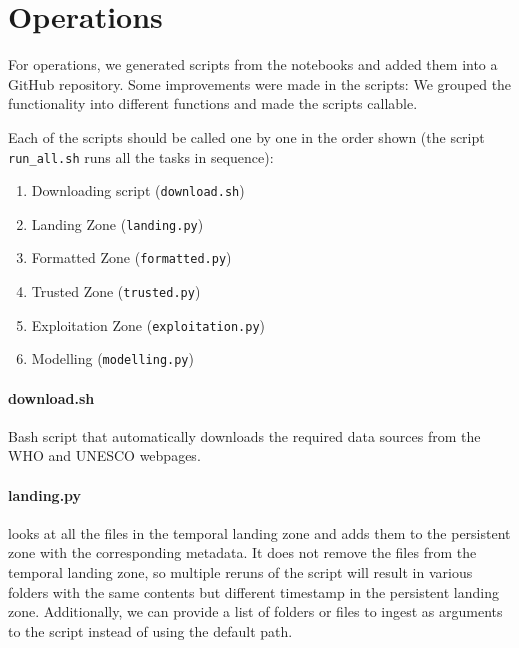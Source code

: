


\section{Operations}

For operations, we generated scripts from the notebooks and added them into a GitHub repository.
Some improvements were made in the scripts: We grouped the functionality into different functions
and made the scripts callable.

Each of the scripts should be called one by one in the order shown (the script \texttt{run\_all.sh} runs
all the tasks in sequence):

\begin{enumerate}
    \item Downloading script (\texttt{download.sh})
    \item Landing Zone (\texttt{landing.py})
    \item Formatted Zone (\texttt{formatted.py})
    \item Trusted Zone (\texttt{trusted.py})
    \item Exploitation Zone (\texttt{exploitation.py})
    \item Modelling (\texttt{modelling.py})
\end{enumerate}

\paragraph{download.sh} Bash script that automatically downloads the required data sources from the WHO and UNESCO webpages.

\paragraph{landing.py} looks at all the files in the temporal landing zone and adds them to the
persistent zone with the corresponding metadata. It does not remove the files from the temporal
landing zone, so multiple reruns of the script will result in various folders with the same contents
but different timestamp in the persistent landing zone. Additionally, we can provide a list of folders
or files to ingest as arguments to the script instead of using the default path.

